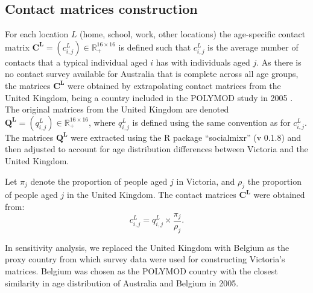 \subsection{Contact matrices construction}
For each location $L$ (home, school, work, other locations) the age-specific contact matrix $\mathbf{C^L} = (c_{i,j}^L) \in \mathbb{R}_{+}^{16 \times 16}$ is defined such that $c_{i,j}^L$ is the average number of contacts that a typical individual aged $i$ has with individuals aged $j$. As there is no contact survey available for Australia that is complete across all age groups, the matrices $\mathbf{C^L}$ were obtained by extrapolating contact matrices from the United Kingdom, being a country included in the POLYMOD study in 2005 \cite{RN141}. The original matrices from the United Kingdom are denoted $\mathbf{Q^L} = (q_{i,j}^L) \in \mathbb{R}_{+}^{16 \times 16}$, where $q_{i,j}^L$ is defined using the same convention as for $c_{i,j}^L$. The matrices $\mathbf{Q^L}$ were extracted using the R package ``socialmixr'' (v 0.1.8) and then adjusted to account for age distribution differences between Victoria and the United Kingdom.

Let $\pi_j$ denote the proportion of people aged $j$ in Victoria, and $\rho_j$ the proportion of people aged $j$ in the United Kingdom. The contact matrices $\mathbf{C^L}$ were obtained from:
$$
c_{i,j}^L = q_{i,j}^L \times \frac{\pi_j}{\rho_j} . 
$$

In sensitivity analysis, we replaced the United Kingdom with Belgium as the proxy country from which survey data were used for constructing Victoria's matrices. Belgium was chosen as the POLYMOD country with the closest similarity in age distribution of Australia and Belgium in 2005.
